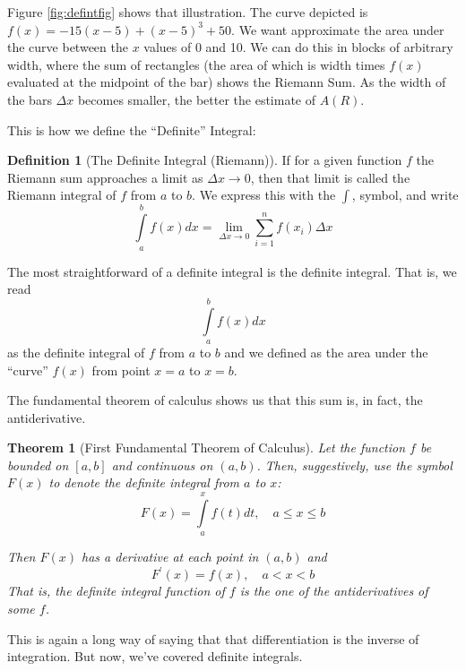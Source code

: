 \documentclass[
]{book}
\newtheorem{theorem}{Theorem}[chapter]
\theoremstyle{definition}
\newtheorem{definition}{Definition}[chapter]
\theoremstyle{definition}
\theoremstyle{definition}
\theoremstyle{remark}
\begin{document}
Figure \ref{fig:defintfig} shows that illustration. The curve depicted is \(f(x) = -15(x - 5) + (x - 5)^3 + 50.\) We want approximate the area under the curve between the \(x\) values of 0 and 10. We can do this in blocks of arbitrary width, where the sum of rectangles (the area of which is width times \(f(x)\) evaluated at the midpoint of the bar) shows the Riemann Sum. As the width of the bars \(\Delta x\) becomes smaller, the better the estimate of \(A(R)\).

This is how we define the ``Definite'' Integral:

\begin{definition}[The Definite Integral (Riemann)]
\protect\hypertarget{def:unnamed-chunk-26}{}{\label{def:unnamed-chunk-26} {} }If for a given function \(f\) the Riemann sum approaches a limit as \(\Delta x \to 0\), then that limit is called the Riemann integral of \(f\) from \(a\) to \(b\). We express this with the \(\int\), symbol, and write \[\int\limits_a^b f(x) dx= \lim\limits_{\Delta x\to 0} \sum\limits_{i=1}^n f(x_i)\Delta x\]

The most straightforward of a definite integral is the definite integral. That is, we read
\[\int\limits_a^b f(x) dx\] as the definite integral of \(f\) from \(a\) to \(b\) and we defined as the area under the ``curve'' \(f(x)\) from point \(x=a\) to \(x=b\).
\end{definition}

The fundamental theorem of calculus shows us that this sum is, in fact, the antiderivative.

\begin{theorem}[First Fundamental Theorem of Calculus]
\protect\hypertarget{thm:unnamed-chunk-27}{}{\label{thm:unnamed-chunk-27} {} }Let the function \(f\) be bounded on \([a,b]\) and continuous on \((a,b)\). Then, suggestively, use the symbol \(F(x)\) to denote the definite integral from \(a\) to \(x\):
\[F(x)=\int\limits_a^x f(t)dt, \quad a\le x\le b\]

Then \(F(x)\) has a derivative at each point in \((a,b)\) and \[F^\prime(x)=f(x), \quad a<x<b\]
That is, the definite integral function of \(f\) \emph{is} the one of the antiderivatives of some \(f\).
\end{theorem}

This is again a long way of saying that that differentiation is the inverse of integration. But now, we've covered definite integrals.
\end{document}
